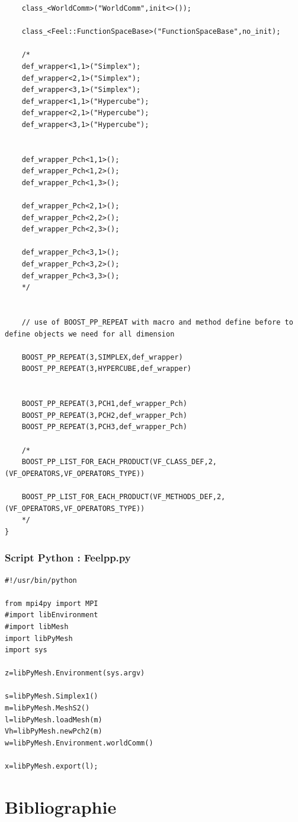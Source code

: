 \documentclass[french,12pt]{article}
\begin{document}
\begin{lstlisting}
    class_<WorldComm>("WorldComm",init<>());

    class_<Feel::FunctionSpaceBase>("FunctionSpaceBase",no_init);

    /*
    def_wrapper<1,1>("Simplex");
    def_wrapper<2,1>("Simplex");
    def_wrapper<3,1>("Simplex");
    def_wrapper<1,1>("Hypercube");
    def_wrapper<2,1>("Hypercube");
    def_wrapper<3,1>("Hypercube");
    
    
    def_wrapper_Pch<1,1>();
    def_wrapper_Pch<1,2>();
    def_wrapper_Pch<1,3>();

    def_wrapper_Pch<2,1>();
    def_wrapper_Pch<2,2>();
    def_wrapper_Pch<2,3>();

    def_wrapper_Pch<3,1>();
    def_wrapper_Pch<3,2>();
    def_wrapper_Pch<3,3>();
    */


    // use of BOOST_PP_REPEAT with macro and method define before to define objects we need for all dimension

    BOOST_PP_REPEAT(3,SIMPLEX,def_wrapper)
    BOOST_PP_REPEAT(3,HYPERCUBE,def_wrapper)


    BOOST_PP_REPEAT(3,PCH1,def_wrapper_Pch)
    BOOST_PP_REPEAT(3,PCH2,def_wrapper_Pch)
    BOOST_PP_REPEAT(3,PCH3,def_wrapper_Pch)

    /*
    BOOST_PP_LIST_FOR_EACH_PRODUCT(VF_CLASS_DEF,2,(VF_OPERATORS,VF_OPERATORS_TYPE))

    BOOST_PP_LIST_FOR_EACH_PRODUCT(VF_METHODS_DEF,2,(VF_OPERATORS,VF_OPERATORS_TYPE))
    */
}
\end{lstlisting}
\subsubsection{Script Python : Feelpp.py}
\begin{lstlisting}
#!/usr/bin/python

from mpi4py import MPI
#import libEnvironment
#import libMesh
import libPyMesh
import sys

z=libPyMesh.Environment(sys.argv)

s=libPyMesh.Simplex1()
m=libPyMesh.MeshS2()
l=libPyMesh.loadMesh(m)
Vh=libPyMesh.newPch2(m)
w=libPyMesh.Environment.worldComm()

x=libPyMesh.export(l);
\end{lstlisting}

\newpage
\section{Bibliographie}
\end{document}
